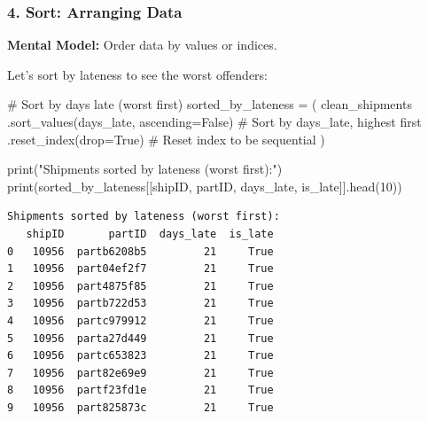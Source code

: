 \documentclass[
  letterpaper,
  DIV=11,
  numbers=noendperiod]{scrartcl}
\newenvironment{Shaded}{\begin{snugshade}}{\end{snugshade}}
\newcommand{\BuiltInTok}[1]{\textcolor[rgb]{0.00,0.23,0.31}{#1}}
\newcommand{\CommentTok}[1]{\textcolor[rgb]{0.37,0.37,0.37}{#1}}
\newcommand{\DecValTok}[1]{\textcolor[rgb]{0.68,0.00,0.00}{#1}}
\newcommand{\NormalTok}[1]{\textcolor[rgb]{0.00,0.23,0.31}{#1}}
\newcommand{\OperatorTok}[1]{\textcolor[rgb]{0.37,0.37,0.37}{#1}}
\newcommand{\StringTok}[1]{\textcolor[rgb]{0.13,0.47,0.30}{#1}}
\newcommand{\VariableTok}[1]{\textcolor[rgb]{0.07,0.07,0.07}{#1}}
\begin{document}
\subsubsection{4. Sort: Arranging Data}\label{sort-arranging-data}

\textbf{Mental Model:} Order data by values or indices.

Let's sort by lateness to see the worst offenders:

\label{mental-model-4-sort}
\begin{Shaded}
\begin{Highlighting}[]
\CommentTok{\# Sort by days late (worst first)}
\NormalTok{sorted\_by\_lateness }\OperatorTok{=}\NormalTok{ (}
\NormalTok{    clean\_shipments}
\NormalTok{    .sort\_values(}\StringTok{\textquotesingle{}days\_late\textquotesingle{}}\NormalTok{, ascending}\OperatorTok{=}\VariableTok{False}\NormalTok{)  }\CommentTok{\# Sort by days\_late, highest first}
\NormalTok{    .reset\_index(drop}\OperatorTok{=}\VariableTok{True}\NormalTok{)  }\CommentTok{\# Reset index to be sequential}
\NormalTok{)}

\BuiltInTok{print}\NormalTok{(}\StringTok{"Shipments sorted by lateness (worst first):"}\NormalTok{)}
\BuiltInTok{print}\NormalTok{(sorted\_by\_lateness[[}\StringTok{\textquotesingle{}shipID\textquotesingle{}}\NormalTok{, }\StringTok{\textquotesingle{}partID\textquotesingle{}}\NormalTok{, }\StringTok{\textquotesingle{}days\_late\textquotesingle{}}\NormalTok{, }\StringTok{\textquotesingle{}is\_late\textquotesingle{}}\NormalTok{]].head(}\DecValTok{10}\NormalTok{))}
\end{Highlighting}
\end{Shaded}

\begin{verbatim}
Shipments sorted by lateness (worst first):
   shipID       partID  days_late  is_late
0   10956  partb6208b5         21     True
1   10956  part04ef2f7         21     True
2   10956  part4875f85         21     True
3   10956  partb722d53         21     True
4   10956  partc979912         21     True
5   10956  parta27d449         21     True
6   10956  partc653823         21     True
7   10956  part82e69e9         21     True
8   10956  partf23fd1e         21     True
9   10956  part825873c         21     True
\end{verbatim}
\end{document}
